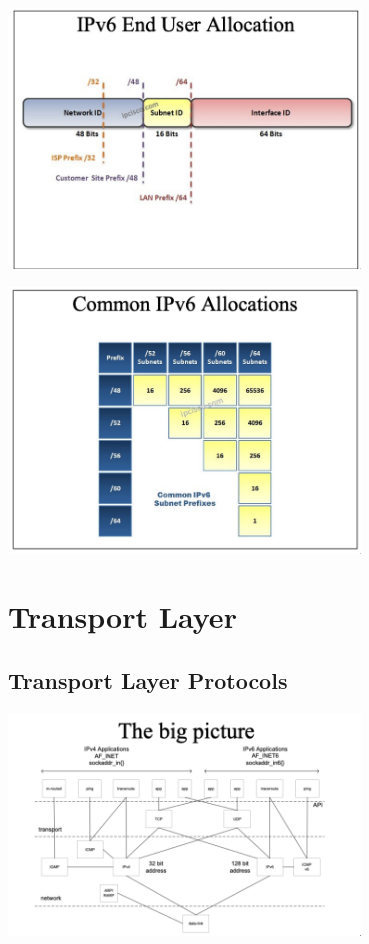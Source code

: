 \documentclass[11pt]{article}
\begin{document}
\begin{center}
    \includegraphics[width=0.7\textwidth]{ipv6addressenduserallocation.png}
\end{center}

\begin{center}
    \includegraphics[width=0.7\textwidth]{commonipv6allocations.png}
\end{center}

\section{Transport Layer}
\subsection{Transport Layer Protocols}
\begin{center}
    \includegraphics[width=0.7\textwidth]{thebigpicture.png}
\end{center}
\end{document}
